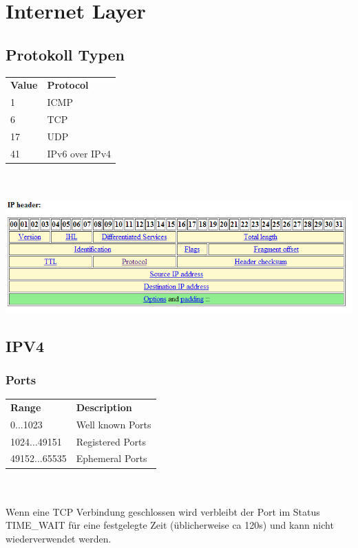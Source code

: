 \section{Internet Layer}

\subsection{Protokoll Typen}

\begin{tabular}[h]{ll}
  \textbf{Value} & \textbf{Protocol} \\
  1 & ICMP \\
  6 & TCP\\
  17 & UDP\\
  41 & IPv6 over IPv4
 \end{tabular}
 \\
 \\
\includegraphics[scale=0.8]{media/IPHeader.png}


\subsection{IPV4}

\subsubsection{Ports}
\begin{tabular}[h]{ll}
  \textbf{Range} & \textbf{Description} \\
  0...1023 & Well known Ports \\
  1024...49151 & Registered Ports\\
  49152...65535 & Ephemeral Ports\\
 \end{tabular}
\\
\\ 

Wenn eine TCP Verbindung geschlossen wird verbleibt der Port im Status TIME\_WAIT für eine festgelegte Zeit (üblicherweise ca 120s) und kann nicht wiederverwendet werden.


